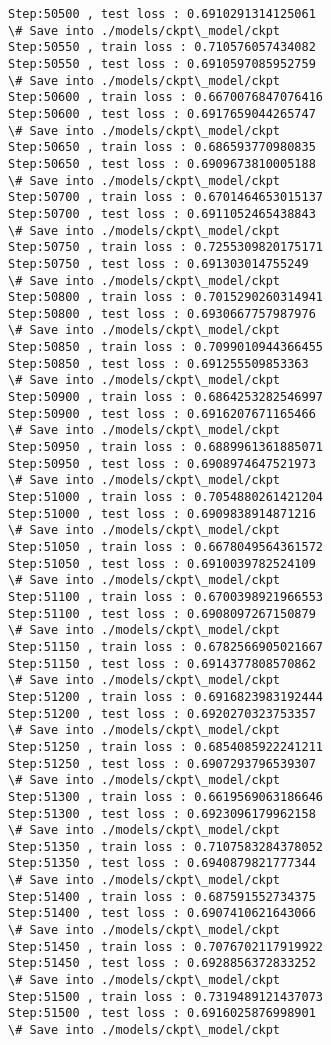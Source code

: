 \documentclass[11pt]{article}
\begin{document}
\begin{Verbatim}[commandchars=\\\{\}]
Step:50500 , test loss : 0.6910291314125061
\# Save into ./models/ckpt\_model/ckpt
Step:50550 , train loss : 0.710576057434082
Step:50550 , test loss : 0.6910597085952759
\# Save into ./models/ckpt\_model/ckpt
Step:50600 , train loss : 0.6670076847076416
Step:50600 , test loss : 0.6917659044265747
\# Save into ./models/ckpt\_model/ckpt
Step:50650 , train loss : 0.686593770980835
Step:50650 , test loss : 0.6909673810005188
\# Save into ./models/ckpt\_model/ckpt
Step:50700 , train loss : 0.6701464653015137
Step:50700 , test loss : 0.6911052465438843
\# Save into ./models/ckpt\_model/ckpt
Step:50750 , train loss : 0.7255309820175171
Step:50750 , test loss : 0.691303014755249
\# Save into ./models/ckpt\_model/ckpt
Step:50800 , train loss : 0.7015290260314941
Step:50800 , test loss : 0.6930667757987976
\# Save into ./models/ckpt\_model/ckpt
Step:50850 , train loss : 0.7099010944366455
Step:50850 , test loss : 0.691255509853363
\# Save into ./models/ckpt\_model/ckpt
Step:50900 , train loss : 0.6864253282546997
Step:50900 , test loss : 0.6916207671165466
\# Save into ./models/ckpt\_model/ckpt
Step:50950 , train loss : 0.6889961361885071
Step:50950 , test loss : 0.6908974647521973
\# Save into ./models/ckpt\_model/ckpt
Step:51000 , train loss : 0.7054880261421204
Step:51000 , test loss : 0.6909838914871216
\# Save into ./models/ckpt\_model/ckpt
Step:51050 , train loss : 0.6678049564361572
Step:51050 , test loss : 0.6910039782524109
\# Save into ./models/ckpt\_model/ckpt
Step:51100 , train loss : 0.6700398921966553
Step:51100 , test loss : 0.6908097267150879
\# Save into ./models/ckpt\_model/ckpt
Step:51150 , train loss : 0.6782566905021667
Step:51150 , test loss : 0.6914377808570862
\# Save into ./models/ckpt\_model/ckpt
Step:51200 , train loss : 0.6916823983192444
Step:51200 , test loss : 0.6920270323753357
\# Save into ./models/ckpt\_model/ckpt
Step:51250 , train loss : 0.6854085922241211
Step:51250 , test loss : 0.6907293796539307
\# Save into ./models/ckpt\_model/ckpt
Step:51300 , train loss : 0.6619569063186646
Step:51300 , test loss : 0.6923096179962158
\# Save into ./models/ckpt\_model/ckpt
Step:51350 , train loss : 0.7107583284378052
Step:51350 , test loss : 0.6940879821777344
\# Save into ./models/ckpt\_model/ckpt
Step:51400 , train loss : 0.687591552734375
Step:51400 , test loss : 0.6907410621643066
\# Save into ./models/ckpt\_model/ckpt
Step:51450 , train loss : 0.7076702117919922
Step:51450 , test loss : 0.6928856372833252
\# Save into ./models/ckpt\_model/ckpt
Step:51500 , train loss : 0.7319489121437073
Step:51500 , test loss : 0.6916025876998901
\# Save into ./models/ckpt\_model/ckpt

\end{Verbatim}
\end{document}
